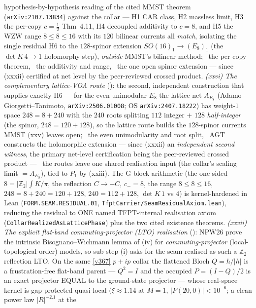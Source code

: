 \documentclass[11pt,a4paper]{article}
\newcommand{\Z}{\mathbb Z}
\begin{document}
\begin{keybox}
hypothesis-by-hypothesis reading of the cited MMST theorem (\texttt{arXiv:2107.13834}) against the collar --- H1 CAR
class, H2 massless limit, H3 the per-copy $c{=}\tfrac12$ Thm~4.11, H4 decoupled additivity to $c{=}8$, and H5 the WZW
range $8{\le}8{\le}16$ with its $120$ bilinear currents all \emph{match}, isolating the single residual H6 to the
$128$-spinor extension $SO(16)_1{\to}(E_8)_1$ (the $\det K\,4{\to}1$ holomorphy step), \emph{outside} MMST's bilinear
method; \mE\ the per-copy theorem, \mC\ the additivity and range, \mO\ the one open spinor extension --- since
(xxxii) certified at net level by the peer-reviewed crossed product. \emph{(xxvi)
The complementary lattice-VOA route} (): the second, independent
construction that supplies exactly H6 --- for the even unimodular $E_8$ the lattice net $A_{E_8}$
(Adamo--Giorgetti--Tanimoto, \texttt{arXiv:2506.01008}; OS \texttt{arXiv:2407.18222}) has weight-$1$ space
$248{=}8{+}240$ with the $240$ roots splitting $112$ integer $+$ $128$ \emph{half-integer} (the spinor,
$248{=}120{+}128$), so the lattice route builds the $128$-spinor currents MMST (xxv) leaves open; \mE\ the even
unimodularity and root split, \mC\ AGT constructs the holomorphic extension --- since (xxxii) an \emph{independent
second witness}, the primary net-level certification being the peer-reviewed crossed product --- \mO\ the routes
leave one shared realisation input (the collar's scaling limit $={}A_{E_8}$), tied to $P_1$ by (xxiii). The G-block arithmetic
(the one-sided $8{=}|\Z_2|\!\int\!K/\pi$, the reflection $C{\to}{-}C$, $c_-{=}8$, the range $8{\le}8{\le}16$,
$248{=}8{+}240{=}120{+}128$, $240{=}112{+}128$, $\det K\,1$ vs $4$) is kernel-hardened in Lean
(\texttt{FORM.SEAM.RESIDUAL.01}, \texttt{TfptCarrier/SeamResidualAxiom.lean}), reducing the residual to ONE named
TFPT-internal realisation axiom (\texttt{CollarRealizedAsLatticePhase}) plus the two cited existence theorems.
\emph{(xxvii) The explicit flat-band commuting-projector (LTO) realisation} (): NPW26
prove the intrinsic Bisognano--Wichmann lemma of (iv) for \emph{commuting-projector} (local-topological-order)
models, so sub-step (i) asks for the seam realised as such a $\Z_2$-reflection LTO. On the same \vref{v367}
$p{+}ip$ collar the flattened Bloch $Q{=}h/|h|$ is a frustration-free flat-band parent --- $Q^2{=}I$ and the
occupied $P{=}(I{-}Q)/2$ is an exact projector EQUAL to the ground-state projector --- whose real-space kernel is
gap-protected quasi-local ($\xi{\approx}1.14$ at $M{=}1$, $|P(20,0)|{<}10^{-6}$; a clean power law $|R|^{-2.1}$ at the

\end{keybox}
\end{document}
